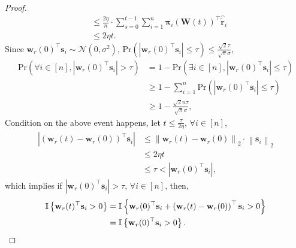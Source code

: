 \documentclass[10pt]{article}
\def\rvs{{\mathbf{s}}}
\def\rvw{{\mathbf{w}}}
\def\rvtilder{{\tilde{\mathbf{r}}}}
\def\pr{{\text{Pr}}}
\def\rvpi{{\boldsymbol{\pi}}}
\def\rmW{{\mathbf{W}}}
\def\sI{{\mathbb{I}}}
\def\gN{{\mathcal{N}}}
\begin{document}
\begin{proof}
\begin{equation*}
\begin{split}
	&\le \frac{2\eta}{n} \cdot \sum\limits_{s=0}^{t-1}{ \sum\limits_{i=1}^{n}{ \rvpi_{i}\left(\rmW(t)\right)^\top \hat{\rvtilder}_i } } \\
	&\le 2 \eta t .
\end{split}
\end{equation*}
Since $\rvw_r(0)^\top \rvs_i \sim \gN(0, \sigma^2)$, $\pr\left(\left| \rvw_r(0)^\top \rvs_i \right| \le \tau\right) \le  \frac{\sqrt{2}\tau}{\sqrt{\pi}\sigma}$,
\begin{equation*}
\begin{split}
	\pr\left(\forall i \in [n], \left| \rvw_r(0)^\top \rvs_i \right| > \tau\right) &= 1 - \pr\left(\exists i \in [n], \left| \rvw_r(0)^\top \rvs_i \right| \le \tau\right) \\
	&\ge 1 - \sum\limits_{i=1}^{n}{ \pr\left(\left| \rvw_r(0)^\top \rvs_i \right| \le \tau\right) } \\
	&\ge 1 - \frac{\sqrt{2}n\tau}{\sqrt{\pi}\sigma},
\end{split}
\end{equation*}
Condition on the above event happens, let $t \le \frac{\tau}{ 2 \eta }$, $\forall i \in [n]$,
\begin{equation*}
\begin{split}
	\left| \left( \rvw_r(t) - \rvw_r(0) \right)^\top \rvs_i \right| &\le \left\| \rvw_r(t) - \rvw_r(0) \right\|_2 \cdot \left\| \rvs_i \right\|_2 \\
	&\le 2 \eta t \\
	&\le \tau < \left| \rvw_r(0)^\top \rvs_i \right|,
\end{split}
\end{equation*}
which implies if $\left| \rvw_r(0)^\top \rvs_i \right| > \tau$, $\forall i \in [n]$, then,
\begin{equation*}
\begin{split}
	\sI\left\{ \rvw_r(t)^\top \rvs_i > 0 \right\} &= \sI\left\{ \rvw_r(0)^\top \rvs_i  + \left( \rvw_r(t) - \rvw_r(0) \right)^\top \rvs_i > 0 \right\} \\
	&= \sI\left\{ \rvw_r(0)^\top \rvs_i > 0 \right\}. \qedhere
\end{split}
\end{equation*}
\end{proof}
\end{document}
